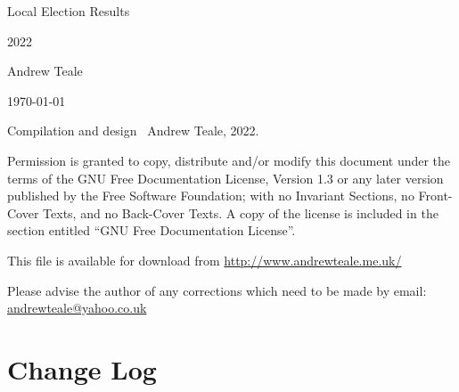 \documentclass[a4paper,openany]{book}
\begin{document}

\begin{titlepage}

\begin{center}

\Huge Local Election Results

2022

\bigskip

\Large Andrew Teale

\vfill

\newcommand\versionno{0.10.1}


\today

\end{center}

\end{titlepage}


\begin{center}

%

\bigskip

Compilation and design \textcopyright\ Andrew Teale, 2022.

 Permission is granted to copy, distribute and/or modify this document
 under the terms of the GNU Free Documentation License, Version 1.3
 or any later version published by the Free Software Foundation;
 with no Invariant Sections, no Front-Cover Texts, and no Back-Cover Texts.
 A copy of the license is included in the section entitled ``GNU
 Free Documentation License''.

\bigskip

This file is available for download from
\url{http://www.andrewteale.me.uk/}

\bigskip

Please advise the author of any corrections which need to be made by
email: \url{andrewteale@yahoo.co.uk}

\vfill
\end{center}

\section*{Change Log}


%
\end{document}
